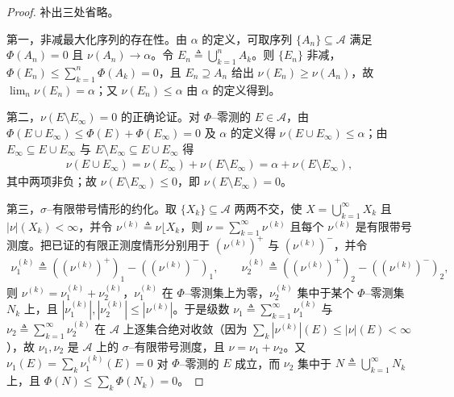 \documentclass[../../main.tex]{subfiles}%
\begin{document}
\begin{proof}
补出三处省略。

第一，非减最大化序列的存在性。由 $\alpha$ 的定义，可取序列 $\{A_n\}\subseteq\mathcal{A}$ 满足 $\Phi(A_n)=0$ 且 $\nu(A_n)\to\alpha$。令 $E_n\triangleq\bigcup_{k=1}^n A_k$。则 $\{E_n\}$ 非减，$\Phi(E_n)\leqslant\sum_{k=1}^n\Phi(A_k)=0$，且 $E_n\supseteq A_n$ 给出 $\nu(E_n)\geqslant\nu(A_n)$，故 $\lim_n\nu(E_n)=\alpha$；又 $\nu(E_n)\leqslant\alpha$ 由 $\alpha$ 的定义得到。

第二，$\nu(E\setminus E_\infty)=0$ 的正确论证。对 $\Phi$--零测的 $E\in\mathcal{A}$，由 $\Phi(E\cup E_\infty)\leqslant\Phi(E)+\Phi(E_\infty)=0$ 及 $\alpha$ 的定义得 $\nu(E\cup E_\infty)\leqslant\alpha$；由 $E_\infty\subseteq E\cup E_\infty$ 与 $E\setminus E_\infty\subseteq E\cup E_\infty$ 得
\begin{align*}
\nu(E\cup E_\infty)=\nu(E_\infty)+\nu(E\setminus E_\infty)=\alpha+\nu(E\setminus E_\infty),
\end{align*}
其中两项非负；故 $\nu(E\setminus E_\infty)\leqslant0$，即 $\nu(E\setminus E_\infty)=0$。

第三，$\sigma$--有限带号情形的约化。取 $\{X_k\}\subseteq\mathcal{A}$ 两两不交，使 $X=\bigcup_{k=1}^\infty X_k$ 且 $|\nu|(X_k)<\infty$，并令 $\nu^{(k)}\triangleq\nu\lfloor X_k$，则 $\nu=\sum_{k=1}^\infty\nu^{(k)}$ 且每个 $\nu^{(k)}$ 是有限带号测度。把已证的有限正测度情形分别用于 $\left(\nu^{(k)}\right)^+$ 与 $\left(\nu^{(k)}\right)^-$，并令
\begin{align*}
\nu_1^{(k)}\triangleq\left(\left(\nu^{(k)}\right)^+\right)_1-\left(\left(\nu^{(k)}\right)^-\right)_1,\qquad
\nu_2^{(k)}\triangleq\left(\left(\nu^{(k)}\right)^+\right)_2-\left(\left(\nu^{(k)}\right)^-\right)_2,
\end{align*}
则 $\nu^{(k)}=\nu_1^{(k)}+\nu_2^{(k)}$，$\nu_1^{(k)}$ 在 $\Phi$--零测集上为零，$\nu_2^{(k)}$ 集中于某个 $\Phi$--零测集 $N_k$ 上，且 $|\nu_1^{(k)}|,|\nu_2^{(k)}|\leqslant|\nu^{(k)}|$。于是级数 $\nu_1\triangleq\sum_{k=1}^\infty\nu_1^{(k)}$ 与 $\nu_2\triangleq\sum_{k=1}^\infty\nu_2^{(k)}$ 在 $\mathcal{A}$ 上逐集合绝对收敛（因为 $\sum_k|\nu^{(k)}|(E)\leqslant|\nu|(E)<\infty$），故 $\nu_1,\nu_2$ 是 $\mathcal{A}$ 上的 $\sigma$--有限带号测度，且 $\nu=\nu_1+\nu_2$。又 $\nu_1(E)=\sum_k\nu_1^{(k)}(E)=0$ 对 $\Phi$--零测的 $E$ 成立，而 $\nu_2$ 集中于 $N\triangleq\bigcup_{k=1}^\infty N_k$ 上，且 $\Phi(N)\leqslant\sum_k\Phi(N_k)=0$。
\end{proof}
\end{document}

